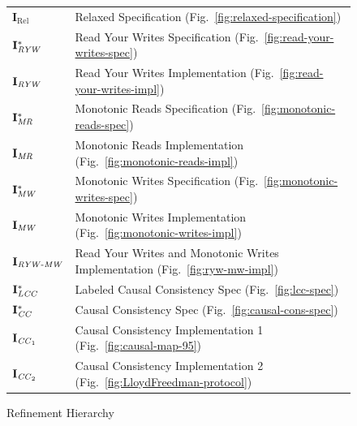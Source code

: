 \begin{figure}[h]
  \vspace{0.5em}
  {\small
  \begin{tabular}{@{}ll@{}}
    $\mathbf{I}_{\mathrm{Rel}}$        & Relaxed Specification (Fig.~\ref{fig:relaxed-specification}) \\
    $\mathbf{I}_{\mathit{RYW}}^{*}$           & Read Your Writes Specification (Fig.~\ref{fig:read-your-writes-spec}) \\
    $\mathbf{I}_{\mathit{RYW}}$               & Read Your Writes Implementation (Fig.~\ref{fig:read-your-writes-impl}) \\
    $\mathbf{I}_{\mathit{MR}}^{*}$            & Monotonic Reads Specification (Fig.~\ref{fig:monotonic-reads-spec}) \\
    $\mathbf{I}_{\mathit{MR}}$                & Monotonic Reads Implementation (Fig.~\ref{fig:monotonic-reads-impl}) \\
    $\mathbf{I}_{\mathit{MW}}^{*}$            & Monotonic Writes Specification (Fig.~\ref{fig:monotonic-writes-spec}) \\
    $\mathbf{I}_{\mathit{MW}}$                & Monotonic Writes Implementation (Fig.~\ref{fig:monotonic-writes-impl}) \\
    $\mathbf{I}_{\mathit{RYW}\text{-}\mathit{MW}}$    & Read Your Writes and Monotonic Writes Implementation (Fig.~\ref{fig:ryw-mw-impl}) \\
    $\mathbf{I}_{\mathit{LCC}}^{*}$           & Labeled Causal Consistency Spec (Fig.~\ref{fig:lcc-spec}) \\
    $\mathbf{I}_{\mathit{CC}}^{*}$            & Causal Consistency Spec (Fig.~\ref{fig:causal-cons-spec}) \\
    $\mathbf{I}_{\mathit{CC}_1}$              & Causal Consistency Implementation 1 (Fig.~\ref{fig:causal-map-95}) \\
    $\mathbf{I}_{\mathit{CC}_2}$              & Causal Consistency Implementation 2 (Fig.~\ref{fig:LloydFreedman-protocol}) \\
  \end{tabular}
  }

  \caption{Refinement Hierarchy}
  \label{fig:refinement-hierarchy}
\end{figure}


